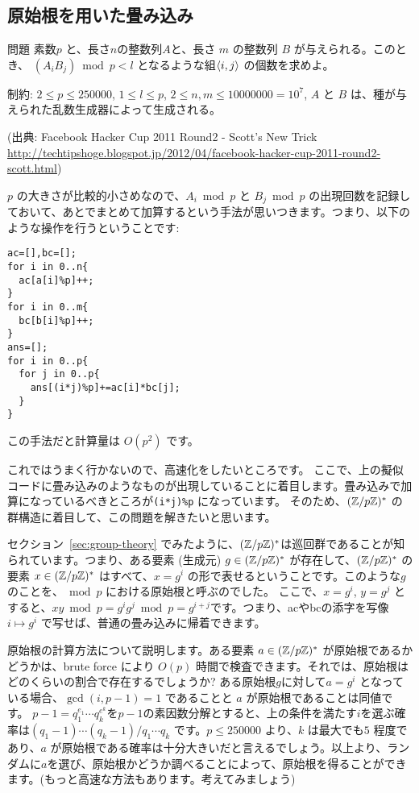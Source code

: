 \documentclass{jsarticle}
\begin{document}
  \subsection{原始根を用いた畳み込み~}
  \label{subsec:convolution-with-primitive-roots}
  \begin{itembox}[l]{問題}
   素数$p$ と、長さ$n$の整数列$A$と、長さ $m$ の整数列 $B$ が与えられる。このとき、
   $(A_i B_j) \bmod p < l$ となるような組$\langle{i, j}\rangle$ の個数を求めよ。

   制約: $2 \le p \le 250000$, $1 \le l \le p$, $2 \le n, m \le 10000000=10^7$,
   $A$ と $B$ は、種が与えられた乱数生成器によって生成される。

   (出典: Facebook Hacker Cup 2011 Round2 - Scott's New Trick \url{http://techtipshoge.blogspot.jp/2012/04/facebook-hacker-cup-2011-round2-scott.html})
  \end{itembox}
  $p$ の大きさが比較的小さめなので、$A_i \bmod p$ と $B_j \bmod p$ の出現回数を記録しておいて、あとでまとめて加算するという手法が思いつきます。つまり、以下のような操作を行うということです:
\begin{verbatim}
ac=[],bc=[];
for i in 0..n{
  ac[a[i]%p]++;
}
for i in 0..m{
  bc[b[i]%p]++;
}
ans=[];
for i in 0..p{
  for j in 0..p{
    ans[(i*j)%p]+=ac[i]*bc[j];
  }
}
\end{verbatim}
  この手法だと計算量は $O(p^2)$ です。

  これではうまく行かないので、高速化をしたいところです。
  ここで、上の擬似コードに畳み込みのようなものが出現していることに着目します。畳み込みで加算になっているべきところが\verb+(i*j)%p+ になっています。
  そのため、$(\mathbb{Z}/p\mathbb{Z})^*$ の群構造に着目して、この問題を解きたいと思います。

  セクション~\ref{sec:group-theory} でみたように、$(\mathbb{Z}/p\mathbb{Z})^*$は巡回群であることが知られています。つまり、ある要素 (生成元) $g \in (\mathbb{Z}/p\mathbb{Z})^*$ が存在して、$(\mathbb{Z}/p\mathbb{Z})^*$ の要素 $x \in (\mathbb{Z}/p\mathbb{Z})^*$ はすべて、$x = g^i$ の形で表せるということです。このような$g$ のことを、${} \bmod p$ における原始根と呼ぶのでした。
  ここで、$x = g^i$, $y = g^j$ とすると、$xy \bmod p = g^ig^j \bmod p = g^{i+j}$です。つまり、acやbcの添字を写像 $i \mapsto g^i$ で写せば、普通の畳み込みに帰着できます。

  原始根の計算方法について説明します。ある要素 $a \in (\mathbb{Z}/p\mathbb{Z})^*$ が原始根であるかどうかは、brute force により $O(p)$ 時間で検査できます。それでは、原始根はどのくらいの割合で存在するでしょうか?
  ある原始根$g$に対して$a = g^i$ となっている場合、$\gcd(i, p - 1) = 1$ であることと
  $a$ が原始根であることは同値です。
  $p-1 = q_1^{e_1} \cdots q_k^{e^k}$を$p-1$の素因数分解とすると、上の条件を満たす$i$を選ぶ確率は$(q_1-1)\cdots(q_k-1)/q_1\cdots q_k$ です。$p\le 250000$ より、$k$ は最大でも$5$ 程度であり、$a$ が原始根である確率は十分大きいだと言えるでしょう。以上より、ランダムに$a$を選び、原始根かどうか調べることによって、原始根を得ることができます。(もっと高速な方法もあります。考えてみましょう)
\end{document}
